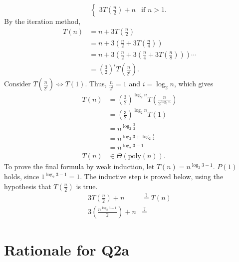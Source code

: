 \documentclass[12pt]{article}
\begin{document}
\begin{enumerate}
\begin{enumerate}
\[\begin{cases}
                3T(\frac{n}{2}) + n &\text{if } n > 1.
            \end{cases}
        \] By the iteration method,
        \begin{align*}
            T(n) &= n + 3T(\tfrac{n}{2}) \\
            &= n + 3(\tfrac{n}{2} + 3T(\tfrac{n}{4})) \\
            &= n + 3(\tfrac{n}{2} + 3(\tfrac{n}{4} + 3T(\tfrac{n}{8}))) \cdots \\
            &= (\tfrac{3}{2})^{i} T(\tfrac{n}{2^{i}}).
        \end{align*}
        Consider $T(\frac{n}{2^{i}}) \Leftrightarrow T(1)$. Thus, $\frac{n}{2^{i}} = 1$ and $i = \log_{2} n$, which gives
        \begin{align*}
            T(n) &= (\tfrac{3}{2})^{\log_{2} n} T(\tfrac{n}{2^{\log_{2} n}}) \\
            &= (\tfrac{3}{2})^{\log_{2} n} T(1) \\
            &= n^{\log_{2} \tfrac{3}{2}} \\
            &= n^{\log_{2} 3 + \log_{2} \frac{1}{2}} \\
            &= n^{\log_{2} 3 - 1} \\
            T(n) &\in \Theta(\text{poly}(n)).
        \end{align*}
        To prove the final formula by weak induction, let $T(n) = n^{\log_{2} 3 - 1}$. $P(1)$ holds, since $1^{\log_{2} 3 - 1} = 1$. The inductive step is proved below, using the hypothesis that $T(\frac{n}{2})$ is true.
        \begin{align*}
            3T(\tfrac{n}{2}) + n &\stackrel{?}{=} T(n) \\
            3(\tfrac{n^{\log_{2} 3 - 1}}{2}) + n &\stackrel{?}{=}
        \end{align*}
    \end{enumerate}
\end{enumerate}

\appendix

\section{Rationale for Q2a}
\end{document}
